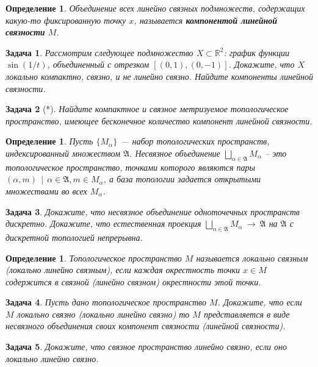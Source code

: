 \documentclass[12pt]{book}
\newcommand{\arrow}{{\:\longrightarrow\:}}
\def\R{{\mathbb R}}
\theoremstyle{upshape}
\newtheorem{zadacha}{Задача}[chapter]
\theoremstyle{generic}
\newtheorem{opredelenie}[teorema]{Определение}
\theoremstyle{upshapenonumber}
\newcommand{\следствие}{%
     \refstepcounter{teorema}
     {\noindent\bf Следствие \thechapter.\arabic{teorema}:\ }}
\newcommand{\пример}{%
     \refstepcounter{teorema}
     {\noindent\bf Пример \thechapter.\arabic{teorema}:\ }}
\newcommand{\лемма}{%
     \refstepcounter{teorema}
     {\noindent\bf Лемма \thechapter.\arabic{teorema}:\ }}
\newcommand{\теорема}{%
     \refstepcounter{teorema}
     {\noindent\bf Теорема \thechapter.\arabic{teorema}:\ }}
\newcommand{\утверждение}{%
     \refstepcounter{teorema}
     {\noindent\bf Утверждение \thechapter.\arabic{teorema}:\ }}
\begin{document}
{\begin{opredelenie}
Объединение всех линейно связных
подмножеств, содержащих какую-то фиксированную точку $x$, называется 
{\bf компонентой линейной связности} $M$.
\end{opredelenie}

\begin{zadacha} 
Рассмотрим следующее подмножество $X\subset \R^2$:
график функции $\sin(1/t)$, объединенный с отрезком
$[(0,1), (0,-1)]$. Докажите, что $X$ локально
компактно, связно, и не линейно связно.
Найдите компоненты линейной связности.
\end{zadacha}

\begin{zadacha}[*]
Найдите компактное и связное метризуемое
топологическое пространство, имеющее
бесконечное количество компонент линейной связности.
\end{zadacha}

\begin{opredelenie}
Пусть $\{M_\alpha\}$ --- набор топологических пространств,
индексированный множеством ${\mathfrak A}$.
Несвязное объединение $\bigsqcup_{\alpha \in \mathfrak A} M_\alpha$ --
это топологическое пространство, точками которого являются пары 
$(\alpha,m) \ \ | \ \  \alpha\in {\mathfrak A}, m\in M_\alpha$,
а база топологии задается открытыми множествами во всех 
$M_\alpha$.
\end{opredelenie}

\begin{zadacha}
Докажите, что несвязное объединение одноточечных  пространств
дискретно. Докажите, что естественная проекция
$\bigsqcup_{\alpha \in \mathfrak A} M_\alpha \arrow {\mathfrak A}$
на ${\mathfrak A}$ с дискретной топологией непрерывна.
\end{zadacha}


\begin{opredelenie}
Топологическое пространство $M$
называется локально связным 
(локально линейно связным), если каждая 
окрестность точки $x\in M$ содержится в связной
(линейно связном) окрестности этой точки.
\end{opredelenie}

\begin{zadacha} 
Пусть дано топологическое пространство $M$.
Докажите, что если $M$ локально связно (локально линейно связно)
то $M$ представляется в виде
несвязного объединения своих компонент связности (линейной связности).
\end{zadacha}

\begin{zadacha}
Докажите, что связное пространство линейно связно,
если оно локально линейно связно.
\end{zadacha}

}
\end{document}
